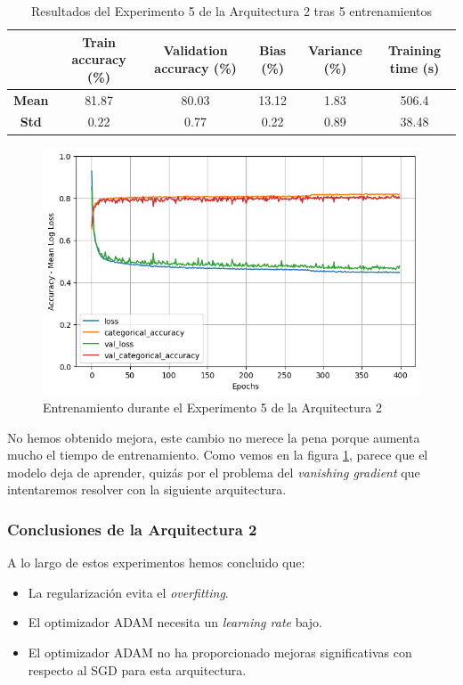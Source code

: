 \documentclass{article}
\begin{document}
			\begin{table}[!h]
				\begin{center}
					\begin{tabular}{ c | c | c | c | c | c |}
						\ & \textbf{Train accuracy (\%)} & \textbf{Validation accuracy (\%)} & \textbf{Bias (\%)} & \textbf{Variance (\%)} & \textbf{Training time (s)} \\ \hline
						\textbf{Mean} & 81.87 & 80.03 & 13.12 & 1.83 & 506.4 \\ \hline
						\textbf{Std} & 0.22 & 0.77 & 0.22 & 0.89 & 38.48 \\ \hline
					\end{tabular}
					\caption{Resultados del Experimento 5 de la Arquitectura 2 tras 5 entrenamientos}
					\label{tab:res-d-a2-e5}
				\end{center}
			\end{table}
			
			\begin{figure}[!h]
				\begin{center}
					\includegraphics[scale=0.5]{d-tr-a2-e5.png}		
					\caption{Entrenamiento durante el Experimento 5 de la Arquitectura 2}	
					\label{d-tr-a2-e5}
				\end{center}
			\end{figure}

			No hemos obtenido mejora, este cambio no merece la pena porque aumenta mucho el tiempo de entrenamiento. Como vemos en la figura \ref{d-tr-a2-e5}, parece que el modelo deja de aprender, quiz\'as por el problema del \textit{vanishing gradient} que intentaremos resolver con la siguiente arquitectura.
		
		\subsubsection{Conclusiones de la Arquitectura 2}
		\label{d-cl-a2}
			A lo largo de estos experimentos hemos concluido que:
			\begin{itemize}
				\item La regularizaci\'on evita el \textit{overfitting}.
				\item El optimizador ADAM necesita un \textit{learning rate} bajo.
				\item El optimizador ADAM no ha proporcionado mejoras significativas con respecto al SGD para esta arquitectura.
			\end{itemize}
			
\end{document}
